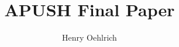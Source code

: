 \documentclass{article}
\title{APUSH Final Paper}
\author{Henry Oehlrich}
\begin{document}
    \maketitle{}
\end{document}
